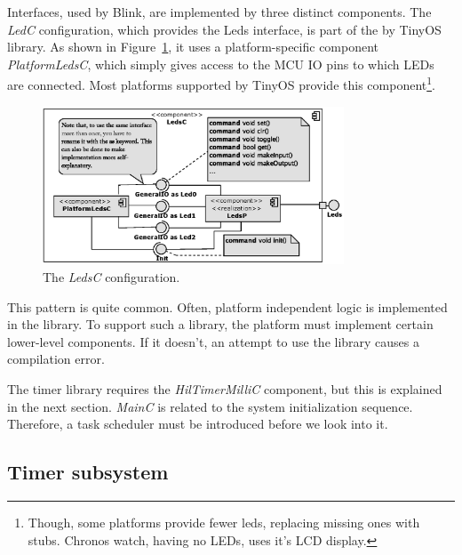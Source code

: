 Interfaces, used by Blink, are implemented by three distinct components.  The \emph{LedC} configuration, which provides the Leds interface, is part of the by TinyOS library.  As shown in Figure~\ref{fig:ledc}, it uses a platform-specific component \emph{PlatformLedsC}, which simply gives access to the MCU IO pins to which LEDs are connected. Most platforms supported by TinyOS provide this component\footnote{Though, some platforms provide fewer leds, replacing missing ones with stubs. Chronos watch, having no LEDs, uses it's LCD display.}.
\begin{figure}[h]
  \centering
  \includegraphics[width=0.8\textwidth]{diagrams/ledsc.eps}
  \caption{The \emph{LedsC} configuration.}
  \label{fig:ledc}
\end{figure}

This pattern is quite common. Often, platform independent logic is implemented in the library. To support such a library, the platform must implement certain lower-level components.  If it doesn't, an attempt to use the library causes a compilation error.

The timer library requires the \emph{HilTimerMilliC} component, but this is explained in the next section. \emph{MainC} is related to the system initialization sequence. Therefore, a task scheduler must be introduced before we look into it.

\subsection{Timer subsystem}
\label{ch:timer_subsystem}

